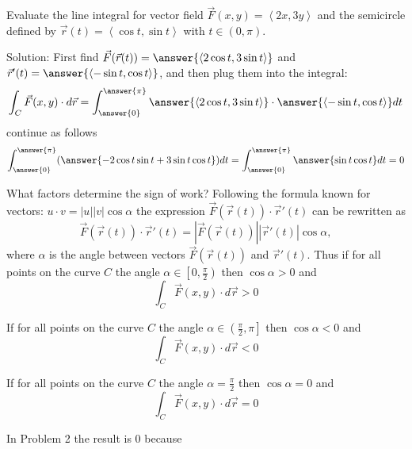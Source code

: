 \documentclass{ximera}
\begin{document}
\begin{problem}
 Evaluate the line integral for vector field $\vec{F}( x,y)=\left<2x ,3y \right>$ and the semicircle defined by $\vec{r}(t)=\left<\cos t,\sin t\right>$ with $t\in\left(0,\pi\right)$.
 
\bigskip

Solution: First find $\vec{F}(\vec{r}(t))=\answer{\left<2\cos t,3\sin t\right>}$ and  $\vec{r}'(t)=\answer{\left<-\sin t,\cos t\right>}$, and then plug them into the integral:
\[
\int_{C}\vec{F}(x,y)\cdot d\vec{r}=\int^{\answer{\pi}}_{\answer{0}}\answer{\left<2\cos t,3 \sin t\right>}\cdot \answer{\left<-\sin t,\cos t\right>}dt
\]
continue as follows
\[
\int^{\answer{\pi}}_{\answer{0}}(\answer{
-2\cos t \sin t+3\sin t\cos t})dt=
\int^{\answer{\pi}}_{\answer{0}}\answer{\sin t \cos t}dt=0
 \]
\end{problem}

What factors determine the sign of work? Following the formula known for vectors: $u\cdot v=\left|u\right|\left|v\right|\cos\alpha$ the expression $\vec{F}(\vec{r}(t))\cdot \vec{r}'(t)$ can be rewritten as
\[
\vec{F}(\vec{r}(t))\cdot \vec{r}'(t)=|\vec{F}(\vec{r}(t))|\left| \vec{r}'(t)\right|\cos\alpha,
\]
where $\alpha$ is the angle between vectors $\vec{F}(\vec{r}(t))$ and $\vec{r}'(t)$. Thus if for all points on the curve $C$ the angle 
$\alpha\in\left[0,\frac{\pi}{2}\right)$ then $\cos\alpha>0$ and 
\[
\int_{C}\vec{F}(x,y)\cdot d\vec{r}>0
\]




\bigskip

If for all points on the curve $C$ the angle $\alpha\in \left(\frac{\pi}{2},\pi\right]$ then $\cos\alpha<0$ and 
\[
\int_{C}\vec{F}(x,y)\cdot d\vec{r}<0
\]

\bigskip

If for all points on the curve $C$ the angle $\alpha=\frac{\pi}{2}$ then $\cos\alpha=0$ and 
\[
\int_{C}\vec{F}(x,y)\cdot d\vec{r}=0
\]

\begin{problem} In Problem 2 the result is $0$ because
\begin{multipleChoice}
\end{multipleChoice}
\end{problem}
\end{document}
